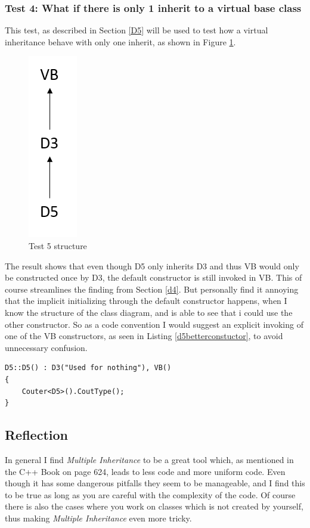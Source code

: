 \subsubsection{Test 4: What if there is only 1 inherit to a virtual base class}
This test, as described in Section \ref{D5} will be used to test how a virtual inheritance behave with only one inherit, as shown in Figure \ref{test5}.
\begin{figure}[H]  
\centering
\includegraphics[scale=0.3]{grafik/test5}
\caption{Test 5 structure}
\label{test5}
\end{figure}
The result shows that even though D5 only inherits D3 and thus VB would only be constructed once by D3, the default constructor is still invoked in VB.
This of course streamlines the finding from Section \ref{d4}. 
But personally find it annoying that the implicit initializing through the default constructor happens, when I know the structure of the class diagram, and is able to see that i could use the other constructor.
So as a code convention I would suggest an explicit invoking of one of the VB constructors, as seen in Listing \ref{d5betterconstuctor}, to avoid unnecessary confusion.
\begin{lstlisting}[caption=Code snippet from D5.cpp line 10, label=d5betterconstuctor]
D5::D5() : D3("Used for nothing"), VB()
{
	Couter<D5>().CoutType();
}
\end{lstlisting}

\subsection{Reflection}
In general I find \textit{Multiple Inheritance} to be a great tool which, as mentioned in the C++ Book on page 624, leads to less code and more uniform code. 
Even though it has some dangerous pitfalls they seem to be manageable, and I find this to be true as long as you are careful with the complexity of the code.
Of course there is also the cases where you work on classes which is not created by yourself, thus making \textit{Multiple Inheritance} even more tricky.

